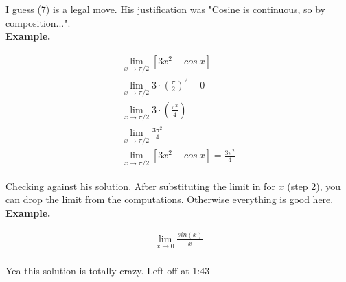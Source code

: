 \documentclass{article}
\begin{document}
I guess (7) is a legal move. His justification was "Cosine is continuous, so by
composition...".\\

\textbf{Example.}

\begin{align*}
    \lim_{x\to \pi/2} [3x^2 + cos~x]\\
    \lim_{x\to \pi/2} 3 \cdot \left( \frac{\pi}{2} \right)^2 + 0\\
    \lim_{x \to \pi/2} 3 \cdot \left( \frac{\pi^2}{4} \right)\\
    \lim_{x \to \pi/2} \frac{3\pi^2}{4}\\
    \lim_{x\to \pi/2} [3x^2 + cos~x] = \frac{3\pi^2}{4}
\end{align*}

Checking against his solution. After substituting the limit in for $x$ (step 2), you can
drop the limit from the computations. Otherwise everything is good here.\\

\textbf{Example.}

\begin{align*}
    \lim_{x\to 0} \frac{sin(x)}{x}\\

\end{align*}

Yea this solution is totally crazy. Left off at 1:43
\end{document}
